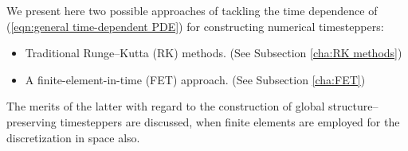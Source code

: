     \line
    
    We present here two possible approaches of tackling the time dependence of (\ref{eqn:general time-dependent PDE}) for constructing numerical timesteppers:
    \begin{itemize}
        \item  Traditional Runge--Kutta (RK) methods. (See Subsection \ref{cha:RK methods})
        \item  A finite-element-in-time (FET) approach. (See Subsection \ref{cha:FET})
    \end{itemize}
    The merits of the latter with regard to the construction of global structure--preserving timesteppers are discussed, when finite elements are employed for the discretization in space also.


    
    
